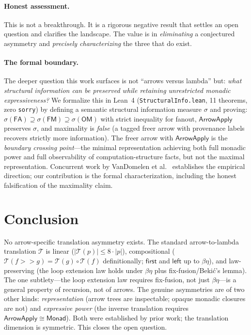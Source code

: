 \documentclass[11pt,a4paper]{article}
\theoremstyle{definition}
\theoremstyle{remark}
\newcommand{\comp}{\mathbin{>\!\!>}}
\newcommand{\first}{\mathsf{first}}
\newcommand{\leftc}{\mathsf{left}}
\newcommand{\ArrowApply}{\mathsf{ArrowApply}}
\newcommand{\T}{\mathcal{T}}
\newcommand{\size}[1]{\lvert #1 \rvert}
\begin{document}
\paragraph{Honest assessment.}
This is not a breakthrough. It is a rigorous negative result that settles
an open question and clarifies the landscape. The value is in
\emph{eliminating} a conjectured asymmetry and \emph{precisely
characterizing} the three that do exist.

\paragraph{The formal boundary.}
The deeper question this work surfaces is not ``arrows versus lambda''
but: \emph{what structural information can be preserved while retaining
unrestricted monadic expressiveness?} We formalize this in Lean~4
(\texttt{StructuralInfo.lean}, 11 theorems, zero \texttt{sorry}) by
defining a semantic structural information measure $\sigma$ and proving:
$\sigma(\mathsf{FA}) \supseteq \sigma(\mathsf{FM}) \supseteq
\sigma(\mathsf{OM})$ with strict inequality for fanout,
$\ArrowApply$ preserves $\sigma$, and maximality is \emph{false} (a
tagged freer arrow with provenance labels recovers strictly more
information). The freer arrow with $\ArrowApply$ is the
\emph{boundary crossing point}---the minimal representation achieving
both full monadic power and full observability of computation-structure
facts, but not the maximal representation. Concurrent work by
VanDomelen et al.~\cite{vandomelen2025freer} establishes the empirical
direction; our contribution is the formal characterization, including
the honest falsification of the maximality claim.

\section{Conclusion}\label{sec:conclusion}

No arrow-specific translation asymmetry exists. The standard
arrow-to-lambda translation $\T$ is linear
($\size{\T(p)} \leq 8\cdot\size{p}$), compositional
($\T(f \comp g) = \T(g) \circ \T(f)$ definitionally; $\first$ and
$\leftc$ up to $\beta\eta$), and law-preserving (the loop extension law
holds under $\beta\eta$ plus fix-fusion/Beki\'c's lemma). The one
subtlety---the loop extension law requires fix-fusion, not just
$\beta\eta$---is a general property of recursion, not of arrows. The
genuine asymmetries are of two other kinds: \emph{representation}
(arrow trees are inspectable; opaque monadic closures are not) and
\emph{expressive power} (the inverse translation requires
$\ArrowApply \cong \mathsf{Monad}$). Both were established by prior
work; the translation dimension is symmetric. This closes the open
question.
\end{document}
